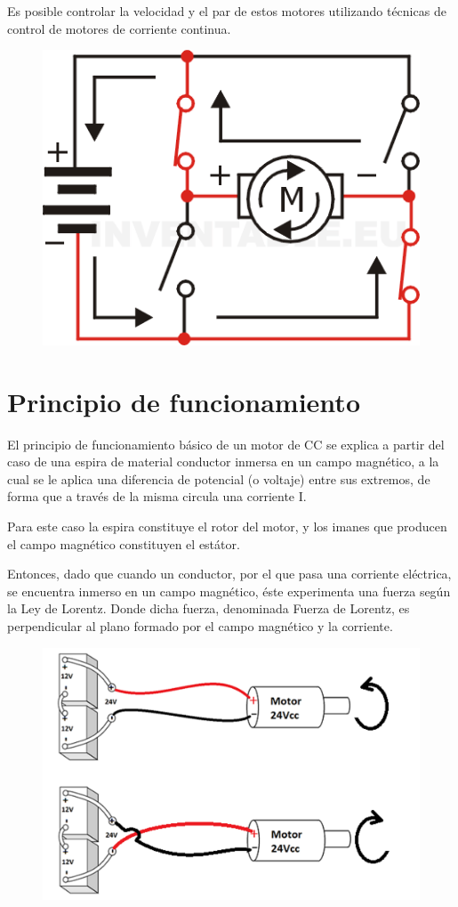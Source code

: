 \documentclass[12pt,a4paper]{article}
\begin{document}
Es posible controlar la velocidad y el par de estos motores utilizando técnicas de control de motores de corriente continua.
\begin{figure}[h!]
\centering
\includegraphics[scale=1]{motor_dc_puente_con_interruptores_giro_orario.png} 

\end{figure}
\newpage
\section{Principio de funcionamiento}
El principio de funcionamiento básico de un motor de CC se explica a partir del caso de una espira de material conductor inmersa en un campo magnético, a la cual se le aplica una diferencia de potencial (o voltaje) entre sus extremos, de forma que a través de la misma circula una corriente I.

Para este caso la espira constituye el rotor del motor, y los imanes que producen el campo magnético constituyen el estátor.

Entonces, dado que cuando un conductor, por el que pasa una corriente eléctrica, se encuentra inmerso en un campo magnético, éste experimenta una fuerza según la Ley de Lorentz. Donde dicha fuerza, denominada Fuerza de Lorentz, es perpendicular al plano formado por el campo magnético y la corriente.
\begin{figure}[h!]
\centering
\includegraphics[scale=.5]{conexion motor cc.png} 
\end{figure}
\end{document}
